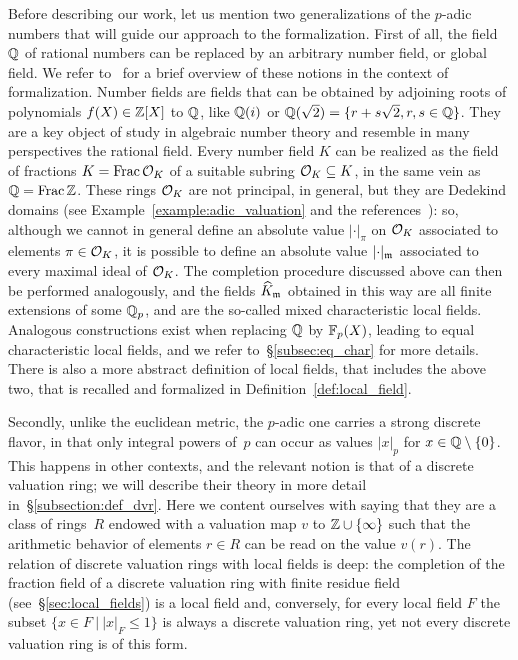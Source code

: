 \documentclass[sigplan,screen]{acmart}
\begin{document}
Before describing our work, let us mention two generalizations of the $p$-adic numbers that will guide our approach to the formalization. First of all, the field $\mathbb{Q}$ of rational numbers can be replaced by an arbitrary number field, or global field. We refer to~\cite[\S2]{BaaDahNarNuc22} for a brief overview of these notions in the context of formalization. Number fields are fields that can be obtained by adjoining roots of polynomials $f(X)\in\mathbb{Z}[X]$ to $\mathbb{Q}$, like $\mathbb{Q}(i)$ or $\mathbb{Q}(\sqrt{2})=\{r+s\sqrt{2}, r,s\in\mathbb{Q}\}$. They are a key object of study in algebraic number theory and resemble in many perspectives the rational field. Every number field $K$ can be realized as the field of fractions $K=\operatorname{Frac}{\mathcal{O}_{K}}$ of a suitable subring $\mathcal{O}_{K}\subseteq K$, in the same vein as $\mathbb{Q}=\operatorname{Frac}{\mathbb{Z}}$. These rings $\mathcal{O}_{K}$ are not principal, in general, but they are Dedekind domains (see Example~\ref{example:adic_valuation} and the references~\ibid): so, although we cannot in general define an absolute value $\lvert\cdot\rvert_\pi$ on $\mathcal{O}_{K}$ associated to elements $\pi\in\mathcal{O}_{K}$, it is possible to define an absolute value $\lvert\cdot\rvert_{\maxid[\empty]}$ associated to every maximal ideal of $\mathcal{O}_{K}$. The completion procedure discussed above can then be performed analogously, and the fields $\compl[{\maxid[\empty]}]{K}$ obtained in this way are all finite extensions of some $\mathbb{Q}_p$, and are the so-called mixed characteristic local fields. Analogous constructions exist when replacing $\mathbb{Q}$ by $\mathbb{F}_{p}(X)$, leading to equal characteristic local fields, and we refer to~\S\ref{subsec:eq_char} for more details. There is also a more abstract definition of local fields, that includes the above two, that is recalled and formalized in Definition~\ref{def:local_field}.

Secondly, unlike the euclidean metric, the $p$-adic one carries a strong discrete flavor, in that only integral powers of~$p$ can occur as values $\lvert x\rvert_p$ for $x\in\mathbb{Q}\setminus\{0\}$. This happens in other contexts, and the relevant notion is that of a discrete valuation ring; we will describe their theory in more detail in~\S\ref{subsection:def_dvr}. Here we content ourselves with saying that they are a class of rings~$R$ endowed with a valuation map $v$ to $\mathbb{Z}\cup\{\infty\}$ such that the arithmetic behavior of elements $r\in R$ can be read on the value $v(r)$. The relation of discrete valuation rings with local fields is deep: the completion of the fraction field of a discrete valuation ring with finite residue field (see~\S\ref{sec:local_fields}) is a local field and, conversely, for every local field $F$ the subset $\{x \in F \:\vert\: \lvert x\rvert_F\leq 1\}$ is always a discrete valuation ring, yet not every discrete valuation ring is of this form.
\end{document}
